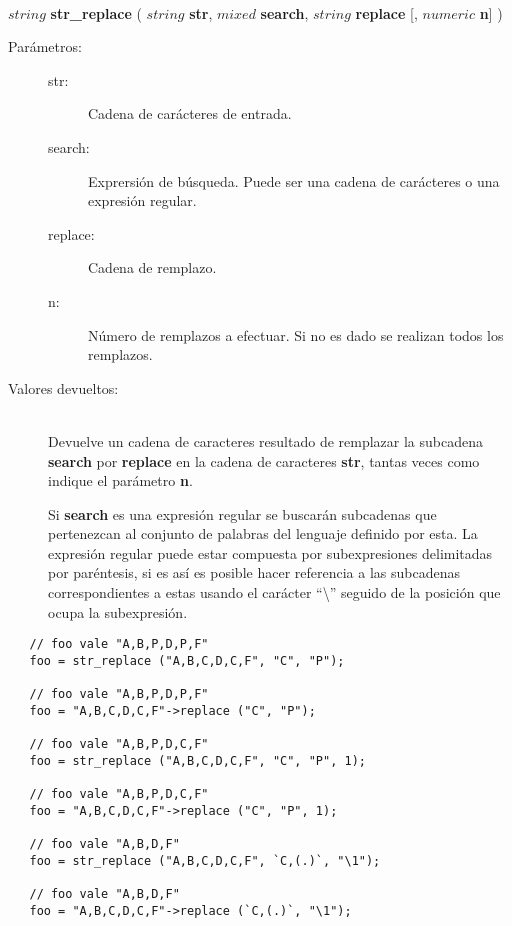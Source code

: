 \begin{framed}
\hfill \\ $string$ \textbf{str\_replace} ( $string$ \textbf{str}, $mixed$ \textbf{search}, $string$ \textbf{replace} [, $numeric$ \textbf{n}] )  
\begin{description}
\item [Parámetros:] \hfill 
   \begin{description}
   \item[str:] Cadena de carácteres de entrada.
   \item[search:] Exprersión de búsqueda. Puede ser una cadena de carácteres o una expresión regular.  
   \item[replace:] Cadena de remplazo.
   \item[n:] Número de remplazos a efectuar. Si no es dado se realizan todos los remplazos.
   \end{description}
\item[Valores devueltos:] \hfill \\
   Devuelve un cadena de caracteres resultado de remplazar la subcadena \textbf{search}  por \textbf{replace}
   en la cadena de caracteres \textbf{str}, tantas veces como indique el parámetro \textbf{n}.
   
   Si \textbf{search} es una expresión regular se buscarán subcadenas que pertenezcan al conjunto de palabras del lenguaje definido por esta. La
   expresión regular puede estar compuesta por subexpresiones delimitadas por paréntesis, si es así es posible hacer referencia a las subcadenas 
   correspondientes a estas usando el carácter ``\textbackslash'' seguido de la posición que ocupa la subexpresión.
   
\end{description}
\end{framed}


\begin{lstlisting}
   // foo vale "A,B,P,D,P,F" 
   foo = str_replace ("A,B,C,D,C,F", "C", "P"); 
   
   // foo vale "A,B,P,D,P,F" 
   foo = "A,B,C,D,C,F"->replace ("C", "P");

   // foo vale "A,B,P,D,C,F" 
   foo = str_replace ("A,B,C,D,C,F", "C", "P", 1); 
   
   // foo vale "A,B,P,D,C,F" 
   foo = "A,B,C,D,C,F"->replace ("C", "P", 1);

   // foo vale "A,B,D,F" 
   foo = str_replace ("A,B,C,D,C,F", `C,(.)`, "\1"); 
   
   // foo vale "A,B,D,F" 
   foo = "A,B,C,D,C,F"->replace (`C,(.)`, "\1");
\end{lstlisting}

